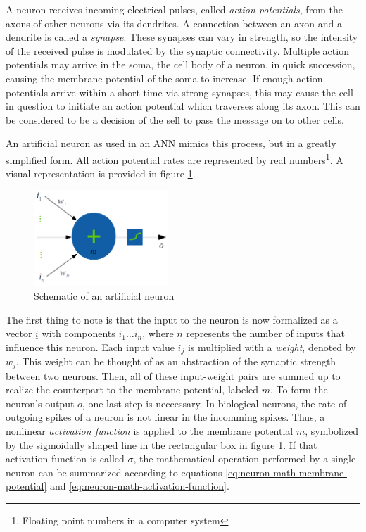 \documentclass[11pt, a4paper]{article}
\renewcommand{\vec}[1]{\underline{#1}}
\begin{document}
A neuron receives incoming electrical pulses, called \emph{action potentials}, from the axons of other neurons via its dendrites. A connection between an axon and a dendrite is called a \emph{synapse}. These synapses can vary in strength, so the intensity of the received pulse is modulated by the synaptic connectivity. Multiple action potentials may arrive in the soma, the cell body of a neuron, in quick succession, causing the membrane potential of the soma to increase. If enough action potentials arrive within a short time via strong synapses, this may cause the cell in question to initiate an action potential which traverses along its axon. This can be considered to be a decision of the sell to pass the message on to other cells.

An artificial neuron as used in an ANN mimics this process, but in a greatly simplified form. All action potential rates are represented by real numbers\footnote{Floating point numbers in a computer system}. A visual representation is provided in figure \ref{fig:artificial-neuron-schematic}.


\begin{figure}[htp]
	\centering
	\includegraphics[width=0.45\textwidth]{images/artificial_neuron.png}
	\caption{Schematic of an artificial neuron}
	\label{fig:artificial-neuron-schematic}
\end{figure}

The first thing to note is that the input to the neuron is now formalized as a vector $\vec{i}$ with components $i_1 \dots i_n$, where $n$ represents the number of inputs that influence this neuron. Each input value $i_j$ is multiplied with a \emph{weight}, denoted by $w_j$. This weight can be thought of as an abstraction of the synaptic strength between two neurons. Then, all of these input-weight pairs are summed up to realize the counterpart to the membrane potential, labeled $m$. To form the neuron's output $o$, one last step is neccessary. In biological neurons, the rate of outgoing spikes of a neuron is not linear in the incomming spikes. Thus, a nonlinear \emph{activation function} is applied to the membrane potential $m$, symbolized by the sigmoidally shaped line in the rectangular box in figure \ref{fig:artificial-neuron-schematic}. If that activation function is called $\sigma$, the mathematical operation performed by a single neuron can be summarized according to equations \eqref{eq:neuron-math-membrane-potential} and \eqref{eq:neuron-math-activation-function}.
\end{document}
